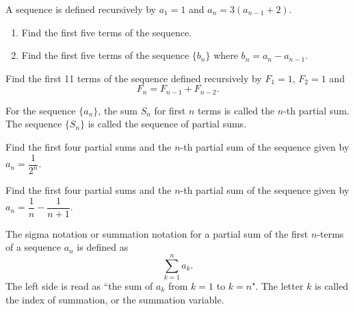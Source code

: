 \begin{example}
   A sequence is defined recursively by $a_1=1$ and $a_n=3(a_{n-1}+2)$.
   \begin{enumerate}
       \item Find the first five terms of the sequence.
       \item Find the first five terms of the sequence $\{b_n\}$ where $b_n=a_n-a_{n-1}$.
   \end{enumerate}
\end{example}

\begin{example}
    Find the first 11 terms of the sequence defined recursively by $F_1=1$, $F_2=1$ and 
    $$F_n=F_{n-1} + F_{n-2}.$$
\end{example}
\vspace*{8\baselineskip}

\begin{definition}
For the sequence $\{a_n\}$, the sum $S_n$ for first $n$ terms is called the $n$-th partial sum. The sequence $\{S_n\}$ is called the sequence of partial sums.
\end{definition}

\begin{example}
    Find the first four partial sums and the $n$-th partial sum of the sequence given by $a_n=\dfrac{1}{2^n}$.
\end{example}
\vspace*{8\baselineskip}

\begin{example}
    Find the first four partial sums and the $n$-th partial sum of the sequence given by $a_n=\dfrac{1}{n}-\dfrac{1}{n+1}$.
\end{example}
\vspace*{8\baselineskip}

\begin{definition}
    The sigma notation or summation notation for a partial sum of the first $n$-terms of a sequence $a_n$ is defined as
    \[\sum_{k=1}^na_k.\]
    The left side is read as ``the sum of $a_k$ from $k=1$ to $k=n$".  The letter
$k$ is called the index of summation, or the summation variable.
\end{definition}

